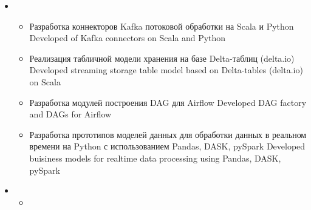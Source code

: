 \documentclass[11pt,a4paper,sans, russian]{moderncv}        %
\begin{document}
{\begin{itemize}
\begin{itemize}
			\item {}
				{Разработка архитектуры интеграции Hadoop и Kubernetes}
				{Hadoop and Kubernetes integration}
			\item {}
				{Разработка архитектуры DataGovernance и DataLineage: LinkedIn DataHub, Atlas}
				{Designed and implemented data governance and data lineage subsystem: LinkedIn DataHub, Apache Atlas}
			\item {}
				{Разработка архитектуры подсистемы качества данных: GreatExpectaion, Apache Griffin}
				{Designed and implemented data quality and data assurance subsystem: Great Expectations, Apache Griffin}
			\item {}
				{Разработка архитектуры виртуализации данных и интеграции озера данных с существующим хранилищем данных, миграция с Hive на Trino}
				{Designed and implemented data virtualization subsystem: Trino; DWH intergation: PolyBase}
			\item {}
				{Разработка и внедрение архитектуры оркестрации данных с использованием Alluxio}
				{Designed data orchestration subsystem: Alluxio }
		\end{itemize}
		\item {}
		\begin{itemize}
			\item {}
				{Разработка коннекторов Kafka потоковой обработки на Scala и Python}
				{Developed of Kafka connectors on Scala and Python}
			\item {}
				{Реализация табличной модели хранения на базе Delta-таблиц (delta.io)}
				{Developed streaming storage table model based on Delta-tables (delta.io) on Scala}
			\item {}
				{Разработка модулей построения DAG для Airflow}
				{Developed DAG factory and DAGs for Airflow}
			\item {}
				{Разработка прототипов моделей данных для обработки данных в реальном времени на Python с использованием Pandas, DASK, pySpark}
				{Developed buisiness models for realtime data processing using Pandas, DASK, pySpark}
		\end{itemize}
		\item {}
		\begin{itemize}
			\item {}

\end{itemize}
\end{itemize}}
\end{document}
